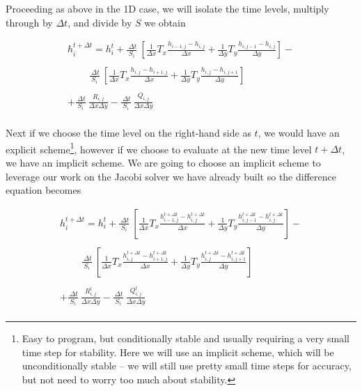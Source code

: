 Proceeding as above in the 1D case, we will isolate the time levels, multiply through by $\Delta t$, and divide by $S$ we obtain

\begin{equation}
\begin{matrix}
h_i^{t+\Delta t} = h_i^{t} +
\frac{~\Delta t}{S_i}~[\frac{1}{\Delta x} T_{x} \frac{h_{i-1,j} - h_{i,j}}{\Delta x} +
 \frac{1}{\Delta y} T_{y} \frac{h_{i,j-1} - h_{i,j}}{\Delta y}] - \\
~~~~~~~~~~\\
~~~~~~~~~~\frac{~\Delta t}{S_i}~[ \frac{1}{\Delta x} T_{x}  \frac{h_{i,j} - h_{i+1,j}}{\Delta x} +
  \frac{1}{\Delta y}  T_{y} \frac{h_{i,j} - h_{i,j+1}}{\Delta y} ]  \\
  ~~~~~~~\\
  +\frac{~\Delta t}{S_i}~ \frac{R_{i,j}}{\Delta x \Delta y} - \frac{~\Delta t}{S_i}~\frac{Q_{i,j}}{\Delta x \Delta y} \\     
\end{matrix}        
\end{equation}

Next if we choose the time level on the right-hand side as $t$, we would have an explicit scheme\footnote{Easy to program, but conditionally stable and usually requiring a very small time step for stability.  Here we will use an implicit scheme, which will be unconditionally stable -- we will still use pretty small time steps for accuracy, but not need to worry too much about stability.}, however if we choose to evaluate at the new time level $t + \Delta t$, we have an implicit scheme.  
We are going to choose an implicit scheme to leverage our work on the Jacobi solver we have already built so the difference equation becomes

\begin{equation}
\begin{matrix}
h_i^{t+\Delta t} = h_i^{t} +
\frac{~\Delta t}{S_i}~[\frac{1}{\Delta x} T_{x} \frac{h_{i-1,j}^{t+\Delta t} - h_{i,j}^{t+\Delta t}}{\Delta x} +
 \frac{1}{\Delta y} T_{y} \frac{h_{i,j-1}^{t+\Delta t} - h_{i,j}^{t+\Delta t}}{\Delta y}] - \\
~~~~~~~~~~\\
~~~~~~~~~~\frac{~\Delta t}{S_i}~[ \frac{1}{\Delta x} T_{x}  \frac{h_{i,j}^{t+\Delta t} - h_{i+1,j}^{t+\Delta t}}{\Delta x} +
  \frac{1}{\Delta y}  T_{y} \frac{h_{i,j}^{t+\Delta t} - h_{i,j+1}^{t+\Delta t}}{\Delta y} ]  \\
  ~~~~~~~\\
  +\frac{~\Delta t}{S_i}~ \frac{R_{i,j}^{t}}{\Delta x \Delta y} - \frac{~\Delta t}{S_i}~\frac{Q_{i,j}^{t}}{\Delta x \Delta y} \\     
\end{matrix}        
\label{eqn:fdm-unsteady-confined}
\end{equation}

